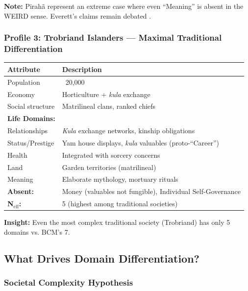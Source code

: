 \textbf{Note:} Pirahã represent an extreme case where even ``Meaning'' is absent in the WEIRD sense. Everett's claims remain debated \citep{everett2008dont, nevins2009piraha}.

\subsubsection{Profile 3: Trobriand Islanders --- Maximal Traditional Differentiation}

\begin{center}
\begin{tabular}{@{}lp{8cm}@{}}
\toprule
\textbf{Attribute} & \textbf{Description} \\
\midrule
Population & ~20,000 \\
Economy & Horticulture + \textit{kula} exchange \\
Social structure & Matrilineal clans, ranked chiefs \\
\midrule
\textbf{Life Domains:} & \\
Relationships & \textit{Kula} exchange networks, kinship obligations \\
Status/Prestige & Yam house displays, \textit{kula} valuables (proto-``Career'') \\
Health & Integrated with sorcery concerns \\
Land & Garden territories (matrilineal) \\
Meaning & Elaborate mythology, mortuary rituals \\
\midrule
\textbf{Absent:} & Money (valuables not fungible), Individual Self-Governance \\
\textbf{N$_{\text{eff}}$:} & 5 (highest among traditional societies) \\
\bottomrule
\end{tabular}
\end{center}

\textbf{Insight:} Even the most complex traditional society (Trobriand) has only 5 domains vs. BCM's 7.

\subsection{What Drives Domain Differentiation?}

\subsubsection{Societal Complexity Hypothesis}

